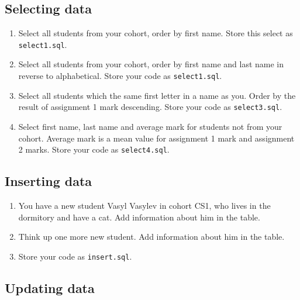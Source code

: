 \documentclass[12pt]{article}
\newcommand{\code}[1]{\texttt{#1}}
\begin{document}
\subsection*{Selecting data}

\begin{enumerate}
\item Select all students from your cohort, order by first name. Store this select as \code{select1.sql}.

\item Select all students from your cohort, order by first name and last name  in reverse to alphabetical. Store your code as \code{select1.sql}.

\item Select all students which the same first letter in a name as you. Order by the result of assignment 1 mark descending. Store your code as \code{select3.sql}.

\item Select first name, last name and average mark for students not from your cohort. Average mark is a mean value for assignment 1 mark and assignment 2 marks. Store your code as \code{select4.sql}.

\end{enumerate}

\subsection*{Inserting data}

\begin{enumerate}

\item You have a new student Vasyl Vasylev in cohort CS1, who lives in the dormitory and have a cat. Add information about him in the table.

\item Think up one more new student. Add information about him in the table.

\item Store your code as \code{insert.sql}.

\end{enumerate}

\subsection*{Updating data}
\end{document}
